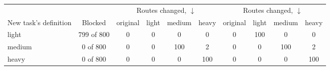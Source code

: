 \begin{tabular}{lccccccccc}
    \toprule
    & & \multicolumn{4}{c}{Routes changed, \cert{} $\downarrow$} & \multicolumn{4}{c}{Routes changed, \nearest{} $\downarrow$} \\
    \cmidrule(lr){3-6} \cmidrule(lr){7-10}
    New task's definition & Blocked & original & light & medium & heavy & original & light & medium & heavy \\
    \midrule
    light & 799 of 800 & 0 & 0 & 0 & 0 & 0 & 100 & 0 & 0 \\
    medium & 0 of 800 & 0 & 0 & 100 & 2 & 0 & 0 & 100 & 2 \\
    heavy & 0 of 800 & 0 & 0 & 0 & 100 & 0 & 0 & 0 & 100 \\
    \bottomrule
\end{tabular}
